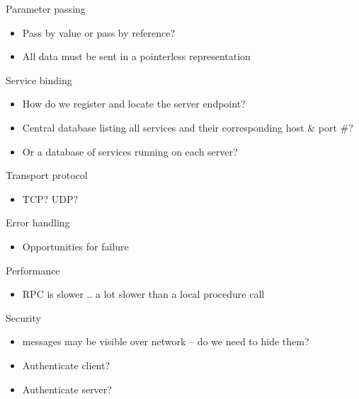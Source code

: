 \begin{slide}

	
	Parameter passing
	\begin{itemize}
		\item Pass by value or pass by reference?
		\item All data must be sent in a pointerless representation
	\end{itemize}
	\bigskip
	
	Service binding
	\begin{itemize}
		\item How do we register and locate the server endpoint?
		\item Central database listing all services and their corresponding host \& port \#?
		\item Or a database of services running on each server?
	\end{itemize}
	\bigskip
	
	Transport protocol
	\begin{itemize}
		\item TCP? UDP? 
	\end{itemize}
	\bigskip
	
\end{slide}
	
\begin{slide}
	
	
	Error handling
	\begin{itemize}
		\item Opportunities for failure
	\end{itemize}
	\bigskip
	
	Performance
	\begin{itemize}
		\item RPC is slower .. a lot slower than a local procedure call
	\end{itemize}
	\bigskip
	
	Security
	\begin{itemize}
		\item messages may be visible over network – do we need to hide them?
		\item Authenticate client?
		\item Authenticate server?
	\end{itemize}
	
\end{slide}

